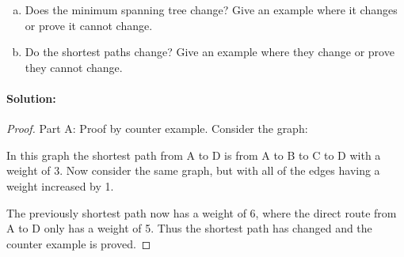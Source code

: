 \documentclass[12pt]{article}
\begin{document}
\begin{enumerate}[(a)]
\item Does the minimum spanning tree change? Give an example where it
      changes or prove it cannot change.
\item Do the shortest paths change? Give an example where they change or
      prove they cannot change.
\end{enumerate}

\paragraph{Solution:}
\begin{proof}
Part A:  Proof by counter example.
Consider the graph:

\begin{center}
\end{center}

In this graph the shortest path from A to D is from A to B to C to D
with a weight of 3. Now consider the same graph, but with all of the
edges having a weight increased by 1.

\begin{center}
\end{center}

The previously shortest path now has a weight of 6, where the direct
route from A to D only has a weight of 5.  Thus the shortest path has
changed and the counter example is proved.
\end{proof}
\end{document}
